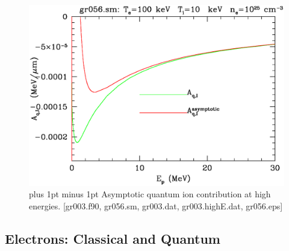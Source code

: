 \documentclass[preprint,12pt,eqsecnum,nofootinbib,amsmath,amssymb]{revtex4}
\newcommand{\footnoteskip}{\baselineskip 12pt plus 1pt minus 1pt}
\begin{document}
\vskip-2cm 
\begin{figure}[h!]
\includegraphics[scale=0.45]{gr056.eps} 
\vskip-0.8cm 
\caption{\footnoteskip  
  Asymptotic quantum ion contribution at high energies. [gr003.f90,
  gr056.sm, gr003.dat, gr003.highE.dat, gr056.eps] 
}
\label{fig:gr056}
\end{figure}

\pagebreak
\subsection{Electrons: Classical and Quantum}
\end{document}
